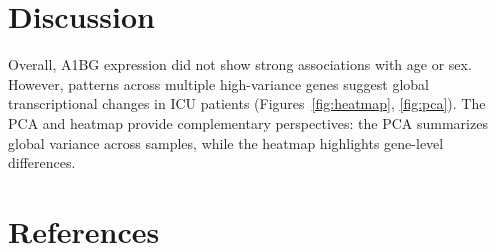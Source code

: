 \documentclass[11pt]{article}
\begin{document}
\section{Discussion}
Overall, A1BG expression did not show strong associations with age or sex. 
However, patterns across multiple high-variance genes suggest global transcriptional changes in ICU patients (Figures~\ref{fig:heatmap}, \ref{fig:pca}). 
The PCA and heatmap provide complementary perspectives: the PCA summarizes global variance across samples, while the heatmap highlights gene-level differences.

\section{References}


\end{document}
